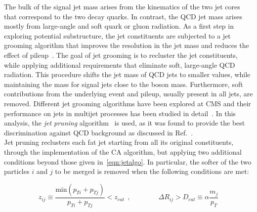 The bulk of the signal jet mass arises from the kinematics of the two jet cores that correspond to the two decay quarks. In contrast, the QCD jet mass arises mostly from large-angle and soft quark or gluon radiation.
As a first step in exploring potential substructure, the jet constituents are subjected to a jet grooming algorithm that improves the resolution in the jet mass and reduces the effect of pileup~\cite{Chatrchyan:2013vbb,Khachatryan:2014vla}. The goal of jet grooming is to recluster the jet constituents, while applying additional requirements that eliminate soft, large-angle QCD radiation. This procedure shifts the jet mass of QCD jets to smaller values, while maintaining the mass for signal jets close to the boson mass. Furthermore, soft contributions from the underlying event and pileup, usually present in all jets, are removed.
Different jet grooming algorithms have been explored at CMS and their performance on jets in multijet processes has been studied in detail~\cite{Chatrchyan:2013vbb,Khachatryan:2014vla}. In this analysis, the \emph{jet pruning} algorithm~\cite{jetpruning1,Ellis:2009me} is used, as it was found to provide the best discrimination against QCD background as discussed in Ref.~\cite{Chatrchyan:2013vbb,Khachatryan:2014vla}.\\

Jet pruning reclusters each fat jet starting from all its original constituents, through the implementation of the CA algorithm, but applying two additional conditions beyond those given in~\ref{eqn:jetalgo}. In particular, the softer of the two particles $i$ and $j$ to be merged is removed when the following conditions are met:

\begin{equation}
z_{ij} \equiv \frac{\mathrm{min}(p_{Ti} + p_{Tj})}{p_{Ti} + p_{Tj}} < z_{cut}\:\:,
\quad\quad\quad\quad
\Delta R_{ij} > D_{cut} \equiv \alpha\frac{m_j}{p_T}
\end{equation}

